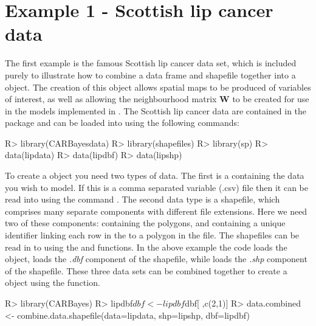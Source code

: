 \documentclass[article,shortnames,nojss]{jss}
\begin{document}
\section{Example 1 - Scottish lip cancer data}
The first example is the famous Scottish lip cancer data set, which is included purely to illustrate how to combine a data frame and shapefile together into a  object. The creation of this object allows spatial maps to be produced of variables of interest, as well as allowing the neighbourhood matrix $\mathbf{W}$ to be created for use in the models implemented in . The Scottish lip cancer data are contained in the  package and can be loaded into  using the following commands:


\begin{Schunk}
\begin{Sinput}
R> library(CARBayesdata)
R> library(shapefiles)
R> library(sp)
R> data(lipdata)
R> data(lipdbf)
R> data(lipshp)
\end{Sinput}
\end{Schunk}

To create a  object you need two types of data. The first is a  containing the data you wish to model. If this is a  comma separated variable (.csv) file then it can be read into  using the command . The second data type is a shapefile, which comprises many separate components with different file extensions. Here we need two of these components:  containing the polygons, and  containing a unique identifier linking each row in the  to a polygon in the  file. The shapefiles can be read in to  using the  and  functions. In the above example the code  loads the  object,  loads the \emph{.dbf} component of the shapefile, while  loads the \emph{.shp} component of the shapefile. These three data sets can be combined together to create a  object using the  function.

\begin{Schunk}
\begin{Sinput}
R> library(CARBayes)
R> lipdbf$dbf <- lipdbf$dbf[ ,c(2,1)]
R> data.combined <- combine.data.shapefile(data=lipdata, shp=lipshp, dbf=lipdbf)
\end{Sinput}
\end{Schunk}
\end{document}
